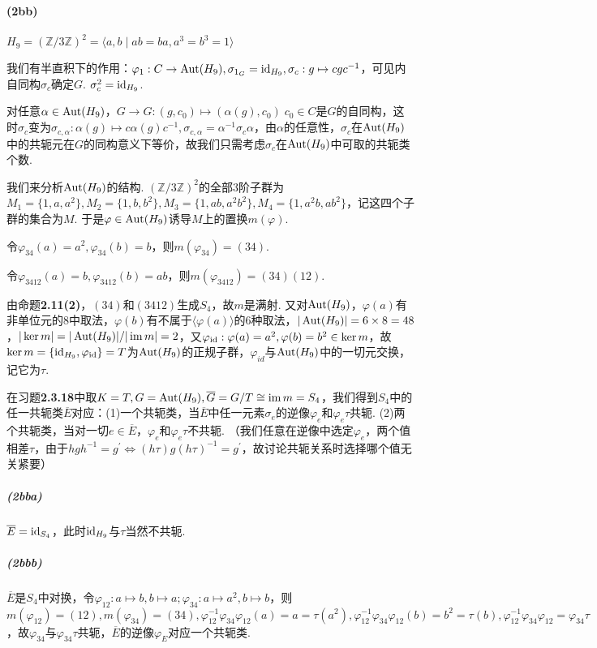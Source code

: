 \paragraph{(2bb)}
$H_9=(\mathbb{Z}/3\mathbb{Z})^2=\langle a,b\mid ab=ba, a^3=b^3=1\rangle$

我们有半直积下的作用：$\varphi_1: C\rightarrow \operatorname{Aut}(H_9), \sigma_{1_G}=\operatorname{id}_{H_9}, \sigma_c: g\mapsto cgc^{-1}$，可见内自同构$\sigma_c$确定$G$. $\sigma_c^2=\operatorname{id}_{H_9}$.

对任意$\alpha\in\operatorname{Aut}(H_9)$，$G\rightarrow G: (g, c_0)\mapsto (\alpha(g),c_0)\;c_0\in C$是$G$的自同构，这时$\sigma_c$变为$\sigma_{c,\alpha}: \alpha(g)\mapsto c\alpha(g)c^{-1}, \sigma_{c,\alpha}=\alpha^{-1}\sigma_c\alpha$，由$\alpha$的任意性，$\sigma_c$在$\operatorname{Aut}(H_9)$中的共轭元在$G$的同构意义下等价，故我们只需考虑$\sigma_c$在$\operatorname{Aut}(H_9)$中可取的共轭类个数.

我们来分析$\operatorname{Aut}(H_9)$的结构. $(\mathbb{Z}/3\mathbb{Z})^2$的全部$3$阶子群为
$M_1=\{1,a,a^2\}, M_2=\{1,b,b^2\}, M_3=\{1,ab,a^2b^2\}, M_4=\{1, a^2b,ab^2\}$，记这四个子群的集合为$M$. 于是$\varphi\in\operatorname{Aut}(H_9)$诱导$M$上的置换$m(\varphi)$.

令$\varphi_{34}(a)=a^2, \varphi_{34}(b)=b$，则$m(\varphi_{34})=(34)$.

令$\varphi_{3412}(a)=b, \varphi_{3412}(b)=ab$，则$m(\varphi_{3412})=(34)(12)$.

由{\heiti 命题}\textbf{2.11(2)}，$(34)$和$(3412)$生成$S_4$，故$m$是满射. 又对$\operatorname{Aut}(H_9)$，$\varphi(a)$有非单位元的$8$中取法，$\varphi(b)$有不属于$\langle \varphi(a)\rangle$的$6$种取法，$|\operatorname{Aut}(H_9)|=6\times8=48$，$|\ker m|=|\operatorname{Aut}(H_9)|/|\operatorname{im} m|=2$，又$\varphi_{\operatorname{id}}: \varphi(a)=a^2,\varphi(b)=b^2\in\ker m$，故$\ker m=\{\operatorname{id}_{H_9}, \varphi_{\operatorname{id}}\}=T$为$\operatorname{Aut}(H_9)$的正规子群，$\varphi_{id}$与$\operatorname{Aut}(H_9)$中的一切元交换，记它为$\tau$.

在{\heiti 习题}\textbf{2.3.18}中取$K=T, G=\operatorname{Aut}(H_9), \overline{G}=G/T\cong\operatorname{im} m=S_4$，我们得到$S_4$中的任一共轭类$\overline{E}$对应：(1)一个共轭类，当$\overline{E}$中任一元素$\sigma_e$的逆像$\varphi_e$和$\varphi_e\tau$共轭. (2)两个共轭类，当对一切$e\in \overline{E}$，$\varphi_e$和$\varphi_e\tau$不共轭. （我们任意在逆像中选定$\varphi_e$，两个值相差$\tau$，由于$hgh^{-1}=g^{\prime}\Leftrightarrow(h\tau)g(h\tau)^{-1}=g^{\prime}$，故讨论共轭关系时选择哪个值无关紧要）

\subparagraph{(2bba)}
$\overline{E}=\operatorname{id}_{S_4}$，此时$\operatorname{id}_{H_9}$与$\tau$当然不共轭.

\subparagraph{(2bbb)}
$\overline{E}$是$S_4$中对换，令$\varphi_{12}: a\mapsto b, b\mapsto a;\varphi_{34}: a\mapsto a^2, b\mapsto b$，则$m(\varphi_{12})=(12),m(\varphi_{34})=(34),
\varphi_{12}^{-1}\varphi_{34}\varphi_{12}(a)=a=\tau(a^2),
\varphi_{12}^{-1}\varphi_{34}\varphi_{12}(b)=b^2=\tau(b),
\varphi_{12}^{-1}\varphi_{34}\varphi_{12}=\varphi_{34}\tau$，故$\varphi_{34}$与$\varphi_{34}\tau$共轭，$\overline{E}$的逆像$\varphi_E$对应一个共轭类.

